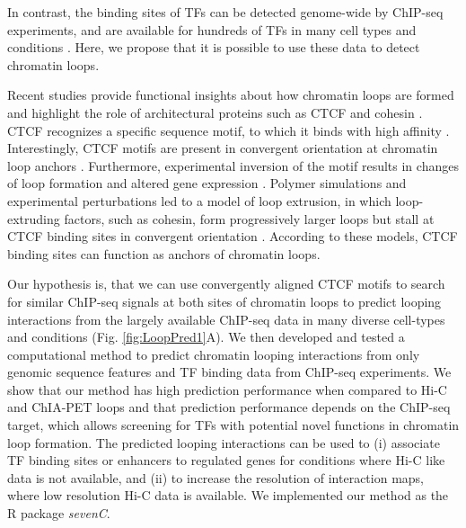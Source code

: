 \documentclass[a4paper,twoside=true,openright,parskip=full,chapterprefix=true,11pt,headings=normal,bibliography=totoc,listof=totoc,titlepage=on,captions=tableabove,draft=false]{scrreprt}
\theoremstyle{definition}
\theoremstyle{definition}
\theoremstyle{definition}
\theoremstyle{remark}
\begin{document}
In contrast, the binding sites of TFs can be detected genome-wide by
ChIP-seq experiments, and are available for hundreds of TFs in many cell
types and conditions \citep{Dunham2012, Davis2017}. Here, we propose
that it is possible to use these data to detect chromatin loops.

Recent studies provide functional insights about how chromatin loops are
formed and highlight the role of architectural proteins such as CTCF and
cohesin \citep{Merkenschlager2016}. CTCF recognizes a specific sequence
motif, to which it binds with high affinity \citep{Kim2007, Nagy2016}.
Interestingly, CTCF motifs are present in convergent orientation at
chromatin loop anchors \citep{Rao2014, Tang2015, VietriRudan2015}.
Furthermore, experimental inversion of the motif results in changes of
loop formation and altered gene expression \citep{Guo2015, deWit2015}.
Polymer simulations and experimental perturbations led to a model of
loop extrusion, in which loop-extruding factors, such as cohesin, form
progressively larger loops but stall at CTCF binding sites in convergent
orientation \citep{Sanborn2015, Fudenberg2016}. According to these
models, CTCF binding sites can function as anchors of chromatin loops.

Our hypothesis is, that we can use convergently aligned CTCF motifs to
search for similar ChIP-seq signals at both sites of chromatin loops to
predict looping interactions from the largely available ChIP-seq data in
many diverse cell-types and conditions (Fig. \ref{fig:LoopPred1}A). We
then developed and tested a computational method to predict chromatin
looping interactions from only genomic sequence features and TF binding
data from ChIP-seq experiments. We show that our method has high
prediction performance when compared to Hi-C and ChIA-PET loops and that
prediction performance depends on the ChIP-seq target, which allows
screening for TFs with potential novel functions in chromatin loop
formation. The predicted looping interactions can be used to (i)
associate TF binding sites or enhancers to regulated genes for
conditions where Hi-C like data is not available, and (ii) to increase
the resolution of interaction maps, where low resolution Hi-C data is
available. We implemented our method as the R package \emph{sevenC}.
\end{document}
